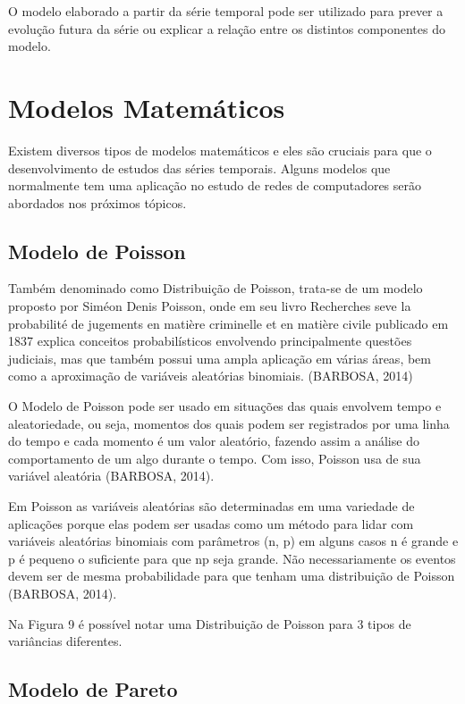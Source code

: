 \documentclass[
	12pt,				%
	openright,			%
	twoside,			%
	a4paper,			%
	english,			%
	french,				%
	spanish,			%
	brazil				%
	]{abntex2}
\begin{document}
O modelo elaborado a partir da série temporal pode ser utilizado para prever a evolução futura da série ou explicar a relação entre os distintos componentes do modelo.

\section{Modelos Matemáticos}

Existem diversos tipos de modelos matemáticos e eles são cruciais para que o desenvolvimento de estudos das séries temporais. Alguns modelos que normalmente tem uma aplicação no estudo de redes de computadores serão abordados nos próximos tópicos.


\subsection{Modelo de Poisson}

Também denominado como Distribuição de Poisson, trata-se de um modelo proposto por Siméon Denis Poisson, onde em seu livro Recherches seve la probabilité de jugements en matière criminelle et en matière civile publicado em 1837 explica conceitos probabilísticos envolvendo principalmente questões judiciais, mas que também possui uma ampla aplicação em várias áreas, bem como a aproximação de variáveis aleatórias binomiais. (BARBOSA, 2014)

O Modelo de Poisson pode ser usado em situações das quais envolvem tempo e aleatoriedade, ou seja, momentos dos quais podem ser registrados por uma linha do tempo e cada momento é um valor aleatório, fazendo assim a análise do comportamento de um algo durante o tempo. Com isso, Poisson usa de sua variável aleatória (BARBOSA, 2014).

Em Poisson as variáveis aleatórias são determinadas em uma variedade de aplicações porque elas podem ser usadas como um método para lidar com variáveis aleatórias binomiais com parâmetros (n, p) em alguns casos n é grande e p é pequeno o suficiente para que np seja grande. Não necessariamente os eventos devem ser de mesma probabilidade para que tenham uma distribuição de Poisson (BARBOSA, 2014). 

Na Figura 9 é possível notar uma Distribuição de Poisson para 3 tipos de variâncias diferentes.


\subsection{Modelo de Pareto}
\end{document}
